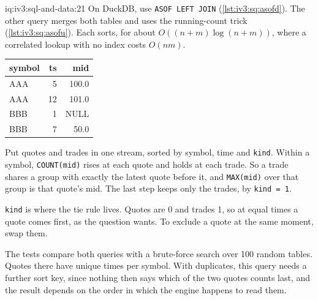 \begin{solution}{iq:iv3:sql-and-data:21}
On DuckDB, use \texttt{ASOF LEFT JOIN} (\cref{lst:iv3:sq:asofd}). The other query merges both tables and uses the running-count trick (\cref{lst:iv3:sq:asofu}). Each sorts, for about $O((n + m) \log(n + m))$, where a correlated lookup with no index costs $O(nm)$.
\label{lst:iv3:sq:asofd}
\label{lst:iv3:sq:asofu}
\begin{center}\small
\begin{tabular}{lrr}
symbol & ts & mid\\\hline
AAA & 5 & 100.0\\
AAA & 12 & 101.0\\
BBB & 1 & NULL\\
BBB & 7 & 50.0
\end{tabular}
\end{center}
Put quotes and trades in one stream, sorted by symbol, time and \texttt{kind}. Within a symbol, \texttt{COUNT(mid)} rises at each quote and holds at each trade. So a trade shares a group with exactly the latest quote before it, and \texttt{MAX(mid)} over that group is that quote's mid. The last step keeps only the trades, by \texttt{kind = 1}.

\texttt{kind} is where the tie rule lives. Quotes are 0 and trades 1, so at equal times a quote comes first, as the question wants. To exclude a quote at the same moment, swap them.

The tests compare both queries with a brute-force search over 100 random tables. Quotes there have unique times per symbol. With duplicates, this query needs a further sort key, since nothing then says which of the two quotes counts last, and the result depends on the order in which the engine happens to read them.

\end{solution}

